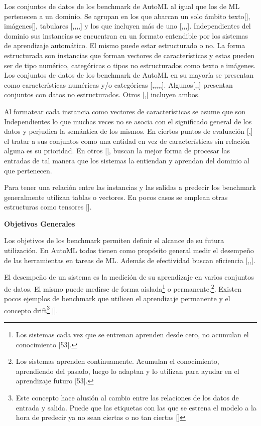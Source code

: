 Los conjuntos de datos de los benchmark de AutoML al igual que los de ML pertenecen a un dominio. Se agrupan en los que abarcan un solo ámbito texto[\cite{20}], 
imágenes[\cite{23}], tabulares [\cite{14},\cite{25},\cite{26},\cite{30},\cite{32}] y los que incluyen más de uno [\cite{10},\cite{16},\cite{26},\cite{31}]. 
Independientes del dominio sus instancias se encuentran en un formato entendible por los sistemas de aprendizaje automático. El mismo puede estar estructurado o no. 
La forma estructurada son instancias que forman vectores de características y estas pueden ser de tipo numérico, categóricas o tipos no estructurados como texto e 
imágenes. Los conjuntos de datos de los benchmark de AutoML en su mayoría se presentan como características numéricas y/o categóricas 
[\cite{10},\cite{11},\cite{15},\cite{18},\cite{19},\cite{31}]. Algunos[\cite{13},\cite{20},\cite{23}] presentan conjuntos con datos no estructurados. Otros 
[\cite{21},\cite{29}] incluyen ambos.

Al formatear cada instancia como vectores de características se asume que son Independientes lo que muchas veces no se asocia con el significado general de los datos y 
perjudica la semántica de los mismos. En ciertos puntos de evaluación [\cite{23},\cite{29}] el tratar a sus conjuntos como una entidad en vez de características sin 
relación alguna es su prioridad. En otros [\cite{27}], buscan la mejor forma de procesar las entradas de tal manera que los sistemas la entiendan y aprendan del 
dominio al que pertenecen.

Para tener una relación entre las instancias y las salidas a predecir los benchmark generalmente utilizan tablas o vectores. En pocos casos se emplean otras estructuras 
como tensores [\cite{29}].

\begin{flushleft} 
    {\large { \textbf{Objetivos Generales}}}\label{subsection:obj_AutoML}
\end{flushleft}

Los objetivos de los benchmark permiten definir el alcance de su futura utilización. En AutoML todos tienen como propósito general medir el desempeño de las 
herramientas en tareas de ML. Además de efectividad buscan eficiencia [\cite{11},\cite{12},\cite{29}].

El desempeño de un sistema es la medición de su aprendizaje en varios conjuntos de datos. El mismo puede medirse de forma aislada\footnote{Los sistemas cada vez 
que se entrenan aprenden desde cero, no acumulan el conocimiento [53].} o permanente.\footnote{Los sistemas aprenden continuamente. Acumulan el conocimiento, 
aprendiendo del pasado, luego lo adaptan y lo utilizan para ayudar en el aprendizaje futuro [53].}. Existen pocos ejemplos de benchmark que utilicen el aprendizaje 
permanente y el concepto drift\footnote{Este concepto hace alusión al cambio entre las relaciones de los datos de entrada y salida. Puede que las etiquetas con las que 
se estrena el modelo a la hora de predecir ya no sean ciertas o no tan ciertas [\cite{54}] } [\cite{12}].

